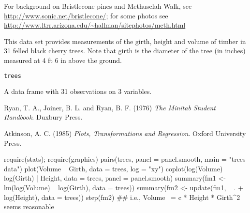 %
\begin{References}\relax
For background on Bristlecone pines and Methuselah Walk, see
\url{http://www.sonic.net/bristlecone/}; for some photos see
\url{http://www.ltrr.arizona.edu/~hallman/sitephotos/meth.html}
\end{References}
%
\begin{Description}\relax
This data set provides measurements of the girth, height and volume
of timber in 31 felled black cherry trees.  Note that girth is the
diameter of the tree (in inches) measured at 4 ft 6 in above the
ground.
\end{Description}
%
\begin{Usage}
\begin{verbatim}
trees
\end{verbatim}
\end{Usage}
%
\begin{Format}
A data frame with 31 observations on 3 variables.

\end{Format}
%
\begin{Source}\relax
Ryan, T. A., Joiner, B. L. and Ryan, B. F. (1976)
\emph{The Minitab Student Handbook}.
Duxbury Press.
\end{Source}
%
\begin{References}\relax
Atkinson, A. C. (1985)
\emph{Plots, Transformations and Regression}.
Oxford University Press.
\end{References}
%
\begin{Examples}
\begin{ExampleCode}
require(stats); require(graphics)
pairs(trees, panel = panel.smooth, main = "trees data")
plot(Volume ~ Girth, data = trees, log = "xy")
coplot(log(Volume) ~ log(Girth) | Height, data = trees,
       panel = panel.smooth)
summary(fm1 <- lm(log(Volume) ~ log(Girth), data = trees))
summary(fm2 <- update(fm1, ~ . + log(Height), data = trees))
step(fm2)
## i.e., Volume ~= c * Height * Girth^2  seems reasonable
\end{ExampleCode}
\end{Examples}
